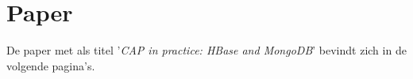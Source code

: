\chapter{Paper}
De paper met als titel '\textit{CAP in practice: HBase and MongoDB}' bevindt zich in de volgende pagina's. 
